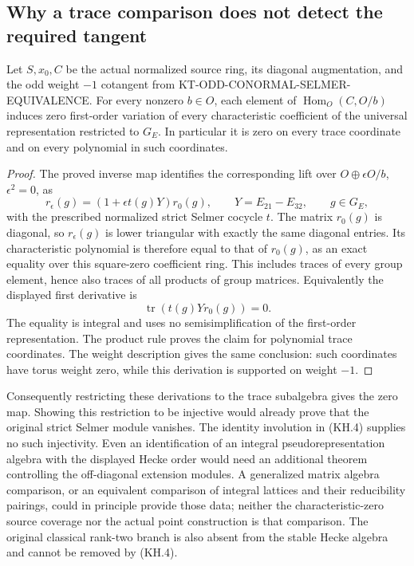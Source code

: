 \subsection{Why a trace comparison does not detect the required tangent}

\begin{lemma}
Let $S,x_0,C$ be the actual normalized source ring, its diagonal
augmentation, and the odd weight $-1$ cotangent from
KT-ODD-CONORMAL-SELMER-EQUIVALENCE.  For every nonzero $b\in O$,
each element of $\operatorname{Hom}_O(C,O/b)$ induces zero
first-order variation of every characteristic coefficient of
the universal representation restricted to $G_E$.  In particular
it is zero on every trace coordinate and on every polynomial
in such coordinates.
\end{lemma}
\begin{proof}
The proved inverse map identifies the corresponding lift over
$O\oplus\epsilon O/b$, $\epsilon^2=0$, as
\[
 r_\epsilon(g)=(1+\epsilon t(g)Y)r_0(g),\qquad
 Y=E_{21}-E_{32},\qquad g\in G_E,                           \tag{KH.6}
\]
with the prescribed normalized strict Selmer cocycle $t$.
The matrix $r_0(g)$ is diagonal, so $r_\epsilon(g)$ is lower
triangular with exactly the same diagonal entries.  Its
characteristic polynomial is therefore equal to that of
$r_0(g)$, as an exact equality over this square-zero coefficient
ring.  This includes traces of every group element, hence also
traces of all products of group matrices.  Equivalently the
displayed first derivative is
\[
             \operatorname{tr}(t(g)Y r_0(g))=0.            \tag{KH.7}
\]
The equality is integral and uses no semisimplification of the
first-order representation.  The product rule proves the claim
for polynomial trace coordinates.  The weight description gives
the same conclusion: such coordinates have torus weight zero,
while this derivation is supported on weight $-1$.
\end{proof}

Consequently restricting these derivations to the trace
subalgebra gives the zero map.  Showing this restriction to be
injective would already prove that the original strict Selmer
module vanishes.  The identity involution in (KH.4) supplies no
such injectivity.  Even an identification of an integral
pseudorepresentation algebra with the displayed Hecke order
would need an additional theorem controlling the off-diagonal
extension modules.  A generalized matrix algebra comparison,
or an equivalent comparison of integral lattices and their
reducibility pairings, could in principle provide those data;
neither the characteristic-zero source coverage nor the actual
point construction is that comparison.  The original classical
rank-two branch is also absent from the stable Hecke algebra and
cannot be removed by (KH.4).

